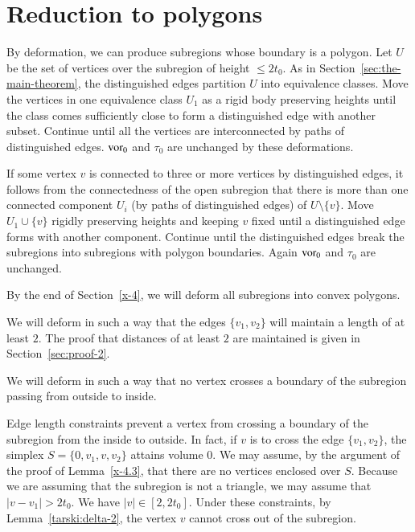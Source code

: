 \section{Reduction to polygons} %

By deformation, we can produce subregions whose boundary is a polygon.
Let $U$ be the set of vertices over the subregion of height $\le2t_0$.
As in Section~\ref{sec:the-main-theorem}, the distinguished edges
partition $U$ into equivalence classes.  Move the vertices in one
equivalence class $U_1$ as a rigid body preserving heights until the
class comes sufficiently close to form a distinguished edge with another
subset. Continue until all the vertices are interconnected by paths of
distinguished edges. $\operatorname{vor}_0$ and $\tau_0$ are unchanged by these
deformations.

If some vertex $v$ is connected to three or more vertices by
distinguished edges, it follows from the connectedness of the open
subregion that there is more than one connected component $U_i$ (by
paths of distinguished edges) of $U\setminus\{v\}$. Move $U_1\cup \{v\}$
rigidly preserving heights and keeping $v$ fixed until a distinguished
edge forms with another component. Continue until the distinguished
edges break the subregions into subregions with polygon boundaries.
Again $\operatorname{vor}_0$ and $\tau_0$ are unchanged.

By the end of Section~\ref{x-4}, we will deform all subregions into
convex polygons.

\begin{remark}
    \label{remark:proof-2}
We will deform in such a way that the edges $\{v_1,v_2\}$ will maintain a
length of at least $2$. The proof that distances of at least $2$ are
maintained is given in Section~\ref{sec:proof-2}.

We will deform in such a way that no vertex  crosses a boundary of the
subregion passing from outside to inside.
\end{remark}

Edge length constraints prevent a vertex from crossing a boundary of the
subregion from the inside to outside.  In fact, if $v$ is to cross the
edge $\{v_1,v_2\}$, the simplex $S=\{0,v_1,v,v_2\}$ attains volume 0.  We
may assume, by the argument of the proof of Lemma~\ref{x-4.3}, that
there are no vertices enclosed over $S$. Because we are assuming that
the subregion is not a triangle, we may assume that $|v-v_1|>2t_0$. We
have $|v|\in[2,2t_0]$.  Under these constraints,
by Lemma~\ref{tarski:delta-2}, the vertex $v$ cannot cross out of the subregion.



